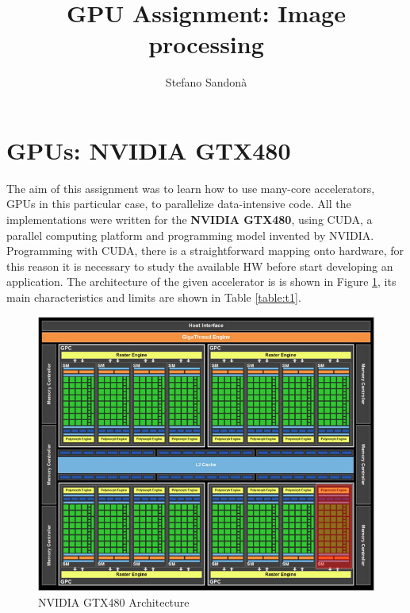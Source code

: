 \documentclass[a4paper]{article}
\begin{document}
\title{GPU Assignment: Image processing}
\author{Stefano Sandonà}
\date{}
		
\maketitle

\section{GPUs: NVIDIA GTX480}
\label{sec:nvidia}
The aim of this assignment was to learn how to use many-core accelerators, GPUs in this particular case, to parallelize data-intensive code. All the implementations were written for the \textbf{NVIDIA GTX480}, using CUDA, a parallel computing platform and programming model invented by NVIDIA. Programming with CUDA, there is a straightforward mapping onto hardware, for this reason it is necessary to study the available HW before start developing an application. The architecture of the given accelerator is is shown in Figure \ref{fig:gtx}, its main characteristics and limits are shown in Table \ref{table:t1}.

\begin{figure}[ht]
    \centering
    \includegraphics[width=0.7\linewidth]{gtx}
    \caption{NVIDIA GTX480 Architecture}
    \label{fig:gtx}
\end{figure}
\FloatBarrier
\end{document}
